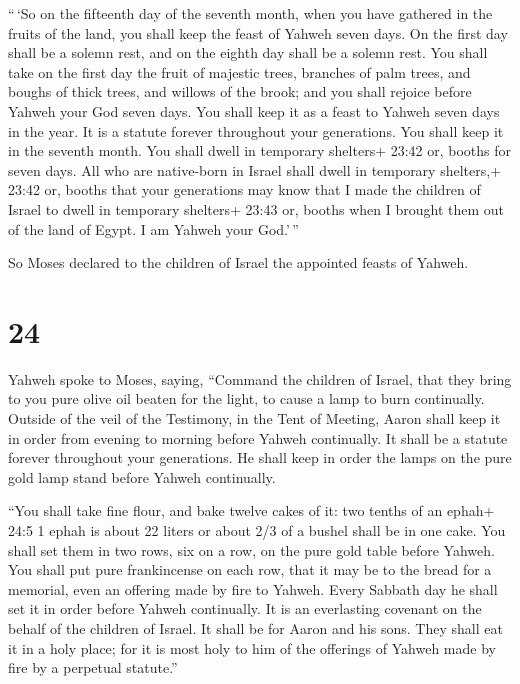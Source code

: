  ``\,`So on the fifteenth day of the seventh month, when
you have gathered in the fruits of the land, you shall keep the feast of
Yahweh seven days. On the first day shall be a solemn rest, and on the
eighth day shall be a solemn rest.  You shall take on the
first day the fruit of majestic trees, branches of palm trees, and
boughs of thick trees, and willows of the brook; and you shall rejoice
before Yahweh your God seven days.  You shall keep it as a
feast to Yahweh seven days in the year. It is a statute forever
throughout your generations. You shall keep it in the seventh month.
 You shall dwell in temporary shelters+ 23:42 or, booths
for seven days. All who are native-born in Israel shall dwell in
temporary shelters,+ 23:42 or, booths  that your
generations may know that I made the children of Israel to dwell in
temporary shelters+ 23:43 or, booths when I brought them out of the land
of Egypt. I am Yahweh your God.'\,''

 So Moses declared to the children of Israel the appointed
feasts of Yahweh.

\hypertarget{section-23}{%
\section{24}\label{section-23}}

 Yahweh spoke to Moses, saying,  ``Command the
children of Israel, that they bring to you pure olive oil beaten for the
light, to cause a lamp to burn continually.  Outside of the
veil of the Testimony, in the Tent of Meeting, Aaron shall keep it in
order from evening to morning before Yahweh continually. It shall be a
statute forever throughout your generations.  He shall keep
in order the lamps on the pure gold lamp stand before Yahweh
continually.

 ``You shall take fine flour, and bake twelve cakes of it:
two tenths of an ephah+ 24:5 1 ephah is about 22 liters or about 2/3 of
a bushel shall be in one cake.  You shall set them in two
rows, six on a row, on the pure gold table before Yahweh. 
You shall put pure frankincense on each row, that it may be to the bread
for a memorial, even an offering made by fire to Yahweh. 
Every Sabbath day he shall set it in order before Yahweh continually. It
is an everlasting covenant on the behalf of the children of Israel.
 It shall be for Aaron and his sons. They shall eat it in a
holy place; for it is most holy to him of the offerings of Yahweh made
by fire by a perpetual statute.''

